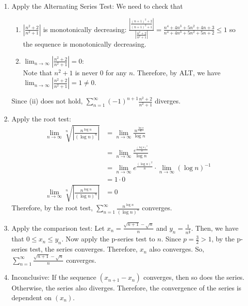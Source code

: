 \documentclass[13pt]{article}
\begin{document}
\begin{enumerate}[label=(\alph*)]
\item Apply the Alternating Series Test: We need to check that
  \begin{enumerate}[label=(\roman*)]
  \item $\left|\frac{n^2 + 2}{n^2 + 1}\right|$ is monotonically
    decreasing: $\frac{\left|\frac{(n + 1)^2 + 2}{(n + 1)^2 +
          1}\right|}{\left|\frac{n^2 + 2}{n^2 + 1}\right|} = \frac{n^4
      + 4n^3 + 5n^2 + 4n + 3}{n^4 + 4n^3 + 5n^2 + 5n + 2} \leq 1$ so
    the sequence is monotonically decreasing.
  \item $\lim_{n \rightarrow \infty} \left|\frac{n^2 + 2}{n^2 +
        1}\right| = 0$: \\
    Note that $n^2 + 1$ is never 0 for any $n$. Therefore, by ALT, we have
    $\lim_{n \rightarrow \infty} \left|\frac{n^2 + 2}{n^2 + 1}\right|
    = 1 \neq 0$.
  \end{enumerate}
  Since (ii) does not hold, $\sum_{n = 1}^{\infty} (-1)^{n + 1}
  \frac{n^2 + 2}{n^2 + 1}$ diverges.
\item Apply the root test:
  \begin{align*}
    \lim_{n \rightarrow \infty} \sqrt[n]{\left|\frac{n^{\log n}}{(\log
    n)^n}\right|} &= \lim_{n \rightarrow \infty} \frac{n^{\frac{\log
                    n}{n}}}{\log n} \\
                  &= \lim_{n \rightarrow \infty} \frac{e^{\frac{(\log n)^2}{n}}}{\log n} \\
                  &= \lim_{n \rightarrow \infty} e^{\frac{(\log
                    n)^2}{n}} \cdot \lim_{n \rightarrow \infty} (\log
                    n)^{-1} \\
                  &= 1 \cdot 0 \\
    \lim_{n \rightarrow \infty} \sqrt[n]{\left|\frac{n^{\log n}}{(\log
    n)^n}\right|} &= 0
  \end{align*}
  Therefore, by the root test, $\sum_{n = 1}^{\infty} \frac{n^{\log
      n}}{(\log n)^n}$ converges.
\item Apply the comparison test:
  Let $x_n = \frac{\sqrt{n + 1} - \sqrt{n}}{n}$ and $y_n =
  \frac{1}{n^{\frac{3}{2}}}$. Then, we have that $0 \leq x_n \leq
  y_n$. Now apply the p-series test to $n$. Since $p = \frac{3}{2} >
  1$, by the p-series test, the series converges. Therefore, $x_n$
  also converges. So, $\sum_{n = 1}^{\infty} \frac{\sqrt{n + 1} -
    \sqrt{n}}{n}$ converges.
\item Inconclusive: If the sequence $(x_{n + 1} - x_n)$ converges,
  then so does the series. Otherwise, the series also
  diverges. Therefore, the convergence of the series is dependent on $(x_n)$.
\end{enumerate}
\end{document}
